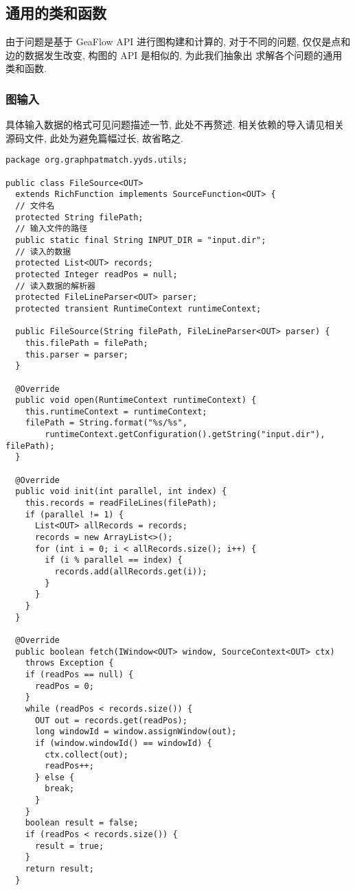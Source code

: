 \subsection{通用的类和函数}
由于问题是基于 GeaFlow API 进行图构建和计算的, 对于不同的问题,
仅仅是点和边的数据发生改变, 构图的 API 是相似的, 为此我们抽象出
求解各个问题的通用类和函数.

\subsubsection{图输入}
具体输入数据的格式可见问题描述一节, 此处不再赘述.
相关依赖的导入请见相关源码文件, 此处为避免篇幅过长, 故省略之.

\begin{center}
\begin{verbatim}
package org.graphpatmatch.yyds.utils;

public class FileSource<OUT>
  extends RichFunction implements SourceFunction<OUT> {
  // 文件名
  protected String filePath;
  // 输入文件的路径
  public static final String INPUT_DIR = "input.dir";
  // 读入的数据
  protected List<OUT> records;
  protected Integer readPos = null;
  // 读入数据的解析器
  protected FileLineParser<OUT> parser;
  protected transient RuntimeContext runtimeContext;

  public FileSource(String filePath, FileLineParser<OUT> parser) {
    this.filePath = filePath;
    this.parser = parser;
  }

  @Override
  public void open(RuntimeContext runtimeContext) {
    this.runtimeContext = runtimeContext;
    filePath = String.format("%s/%s",
        runtimeContext.getConfiguration().getString("input.dir"), filePath);
  }

  @Override
  public void init(int parallel, int index) {
    this.records = readFileLines(filePath);
    if (parallel != 1) {
      List<OUT> allRecords = records;
      records = new ArrayList<>();
      for (int i = 0; i < allRecords.size(); i++) {
        if (i % parallel == index) {
          records.add(allRecords.get(i));
        }
      }
    }
  }

  @Override
  public boolean fetch(IWindow<OUT> window, SourceContext<OUT> ctx)
    throws Exception {
    if (readPos == null) {
      readPos = 0;
    }
    while (readPos < records.size()) {
      OUT out = records.get(readPos);
      long windowId = window.assignWindow(out);
      if (window.windowId() == windowId) {
        ctx.collect(out);
        readPos++;
      } else {
        break;
      }
    }
    boolean result = false;
    if (readPos < records.size()) {
      result = true;
    }
    return result;
  }


\end{verbatim}
\end{center}
